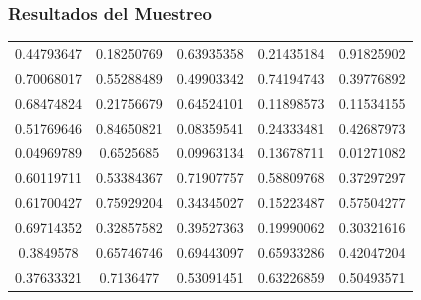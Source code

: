 \documentclass[12pt,a4paper]{article}
\begin{document}
    \subsubsection{Resultados del Muestreo}
        \begin{center}
            \begin{tabular}{ccccc}
                0.44793647 & 0.18250769 & 0.63935358 & 0.21435184 & 0.91825902 \\
                0.70068017 & 0.55288489 & 0.49903342 & 0.74194743 & 0.39776892 \\
                0.68474824 & 0.21756679 & 0.64524101 & 0.11898573 & 0.11534155 \\
                0.51769646 & 0.84650821 & 0.08359541 & 0.24333481 & 0.42687973 \\
                0.04969789 & 0.6525685  & 0.09963134 & 0.13678711 & 0.01271082 \\
                0.60119711 & 0.53384367 & 0.71907757 & 0.58809768 & 0.37297297 \\
                0.61700427 & 0.75929204 & 0.34345027 & 0.15223487 & 0.57504277 \\
                0.69714352 & 0.32857582 & 0.39527363 & 0.19990062 & 0.30321616 \\
                0.3849578  & 0.65746746 & 0.69443097 & 0.65933286 & 0.42047204 \\
                0.37633321 & 0.7136477  & 0.53091451 & 0.63226859 & 0.50493571 
            \end{tabular}
        \end{center}
\end{document}

